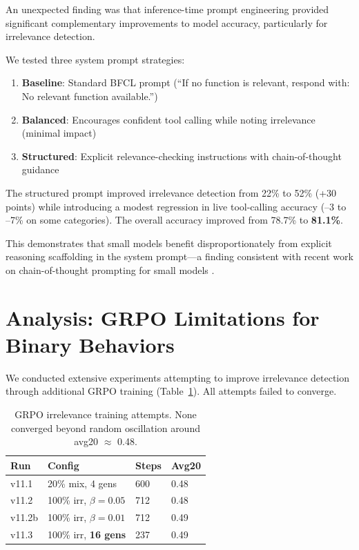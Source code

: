 \documentclass[10pt,twocolumn]{article}
\begin{document}
An unexpected finding was that inference-time prompt engineering provided significant complementary improvements to model accuracy, particularly for irrelevance detection.

We tested three system prompt strategies:

\begin{enumerate}[itemsep=1pt]
    \item \textbf{Baseline}: Standard BFCL prompt (``If no function is relevant, respond with: No relevant function available.'')
    \item \textbf{Balanced}: Encourages confident tool calling while noting irrelevance (minimal impact)
    \item \textbf{Structured}: Explicit relevance-checking instructions with chain-of-thought guidance
\end{enumerate}

The structured prompt improved irrelevance detection from 22\% to 52\% (+30 points) while introducing a modest regression in live tool-calling accuracy (--3 to --7\% on some categories). The overall accuracy improved from 78.7\% to \textbf{81.1\%}.

This demonstrates that small models benefit disproportionately from explicit reasoning scaffolding in the system prompt---a finding consistent with recent work on chain-of-thought prompting for small models \citep{wei2022chain}.

\section{Analysis: GRPO Limitations for Binary Behaviors}

We conducted extensive experiments attempting to improve irrelevance detection through additional GRPO training (Table~\ref{tab:grpo_irr}). All attempts failed to converge.

\begin{table}[!htbp]
\centering
\caption{GRPO irrelevance training attempts. None converged beyond random oscillation around avg20 $\approx$ 0.48.}
\label{tab:grpo_irr}
\begin{tabular}{llll}
\toprule
\textbf{Run} & \textbf{Config} & \textbf{Steps} & \textbf{Avg20} \\
\midrule
v11.1 & 20\% mix, 4 gens & 600 & 0.48 \\
v11.2 & 100\% irr, $\beta{=}0.05$ & 712 & 0.48 \\
v11.2b & 100\% irr, $\beta{=}0.01$ & 712 & 0.49 \\
v11.3 & 100\% irr, \textbf{16 gens} & 237 & 0.49 \\
\bottomrule
\end{tabular}
\end{table}
\end{document}
